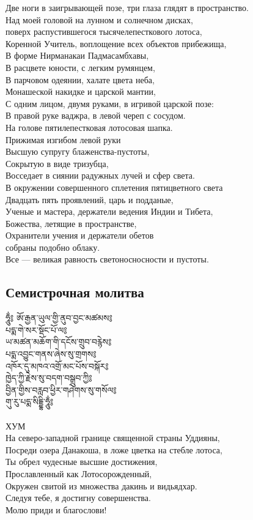 Две ноги в заигрывающей позе, три глаза глядят в пространство.\\
Над моей головой на лунном и солнечном дисках, \\
поверх распустившегося тысячелепесткового лотоса,\\
Коренной Учитель, воплощение всех объектов прибежища,\\
В форме Нирманакаи Падмасамбхавы,\\
В расцвете юности, с легким румянцем,\\
В парчовом одеянии, халате цвета неба, \\
Монашеской накидке и царской мантии,\\
С одним лицом, двумя руками, в игривой царской позе:\\
В правой руке ваджра, в левой череп с сосудом.\\
На голове пятилепестковая лотосовая шапка.\\
Прижимая изгибом левой руки \\
Высшую супругу блаженства-пустоты,\\
Сокрытую в виде тризубца,\\
Восседает в сиянии радужных лучей и сфер света.\\
В окружении совершенного сплетения пятицветного света\\
Двадцать пять проявлений, царь и подданые,\\
Ученые и мастера, держатели ведения Индии и Тибета, \\
Божества, летящие в пространстве, \\
Охранители учения и держатели обетов \\ \indent собраны подобно облаку.\\
Все — великая равность светоносносности и пустоты.
\newpage
\subsection{Семистрочная молитва}
\vspace{0.5cm}
\ti
ཧཱུྂ༔ ཨོ་རྒྱན་ཡུལ་གྱི་ནུབ་བྱང་མཚམས༔\\
པདྨ་གེ་སར་སྡོང་པོ་ལ༔\\
ཡ་མཚན་མཆོག་གི་དངོས་གྲུབ་བརྙེས༔\\
པདྨ་འབྱུང་གནས་ཞེས་སུ་གྲགས༔\\
འཁོར་དུ་མཁའ་འགྲོ་མང་པོས་བསྐོར༔\\
ཁྱེད་ཀྱི་རྗེས་སུ་བདག་བསྒྲུབ་ཀྱི༔\\
བྱིན་གྱིས་བརླབ་ཕྱིར་གཤེགས་སུ་གསོལ༔\\
གུ་རུ་པདྨ་སིདྡྷི་ཧཱུྂ༔\\
\\
\ru
ХУМ \\
На северо-западной границе священной страны Уддияны,\\
Посреди озера Данакоша, в ложе цветка на стебле лотоса,\\
Ты обрел чудесные высшие достижения,\\
Прославленный как Лотосорожденный,\\
Окружен свитой из множества дакинь и видьядхар.\\
Следуя тебе, я достигну совершенства.\\
Молю приди и благослови!
\newpage
